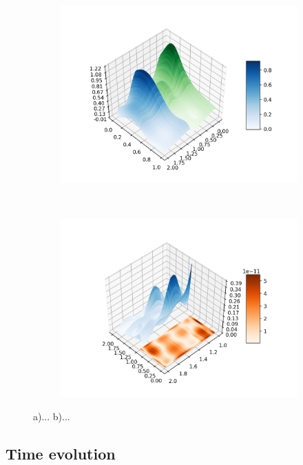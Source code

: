 \begin{figure}[H]
    \centering
    \begin{subfigure}{0.5\textwidth}
        \centering
        \includegraphics[width=\linewidth]{method/bilder/actual}
        \caption{}
    \end{subfigure}%
    ~
    \begin{subfigure}{0.5\textwidth}
        \centering
        \includegraphics[width=\linewidth]{method/bilder/error}
        \caption{}
    \end{subfigure}
    \caption{a)... b)...}
    \label{fig:test}
\end{figure}

\subsection{Time evolution}

